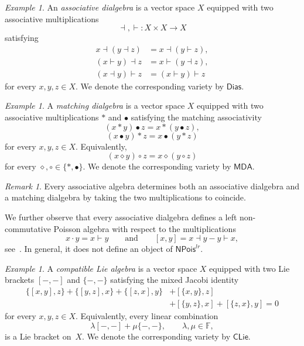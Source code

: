 \documentclass[reqno,a4paper]{amsart}
\theoremstyle{plain}
\theoremstyle{definition}
\theoremstyle{remark}
\newtheorem{remark}[subsection]{Remark}
\newtheorem{example}[subsection]{Example}
\numberwithin{equation}{section}
\newcommand{\F}{\mathbb{F}}
\newcommand{\NP}{\ensuremath{\mathsf{NPois}}}
\newcommand{\Match}{\ensuremath{\mathsf{MDA}}}
\newcommand{\Dias}{\ensuremath{\mathsf{Dias}}}
\newcommand{\CLie}{\ensuremath{\mathsf{CLie}}}
\begin{document}
\begin{example}\cite{LodayDialgebras}\label{ExampleAssociativeDialgebras}
An \emph{associative dialgebra} is a vector space $X$ equipped with two associative multiplications
\[
\dashv,\vdash\colon X\times X\to X
\]
satisfying
\begin{align*}
x\dashv (y\dashv z)&=x\dashv(y\vdash z),\\
(x\vdash y)\dashv z&=x\vdash(y\dashv z),\\
(x\dashv y)\vdash z&=(x\vdash y)\vdash z
\end{align*}
for every $x,y,z\in X$. We denote the corresponding variety by $\Dias$.
\end{example}

\begin{example}\cite{ZhangBaiGuo}\label{ExampleMatchingDialgebras}
A \emph{matching dialgebra} is a vector space $X$ equipped with two associative multiplications $\ast$ and $\bullet$ satisfying the matching associativity
\[
(x\ast y)\bullet z=x\ast(y\bullet z),
\]
\[
(x\bullet y)\ast z=x\bullet(y\ast z)
\]
for every $x,y,z\in X$. Equivalently,
\[
(x\diamond y)\circ z=x\diamond(y\circ z)
\]
for every $\diamond,\circ\in\{\ast,\bullet\}$. We denote the corresponding variety by $\Match$.
\end{example}

\begin{remark}
Every associative algebra determines both an associative dialgebra and a matching dialgebra by taking the two multiplications to coincide.

We further observe that every associative dialgebra defines a left non-commutative Poisson algebra with respect to the multiplications
\[
x\cdot y=x\vdash y
\qquad\text{and}\qquad
[x,y]=x\dashv y-y\vdash x,
\]
see~\cite[Example~2.1.2]{CasasDatuashviliNLP}. In general, it does not define an object of $\NP^{lr}$.
\end{remark}

\begin{example}\cite{Strohmayer}\label{ExampleCompatibleLie}
A \emph{compatible Lie algebra} is a vector space $X$ equipped with two Lie brackets $[-,-]$ and $\{-,-\}$ satisfying the mixed Jacobi identity
\begin{align*}
\{[x,y],z\}+\{[y,z],x\}+\{[z,x],y\}
&+[\{x,y\},z]\\
&+[\{y,z\},x]+[\{z,x\},y]=0
\end{align*}
for every $x,y,z\in X$. Equivalently, every linear combination
\[
\lambda[-,-]+\mu\{-,-\},
\qquad
\lambda,\mu\in\F,
\]
is a Lie bracket on~$X$. We denote the corresponding variety by $\CLie$.
\end{example}
\end{document}
